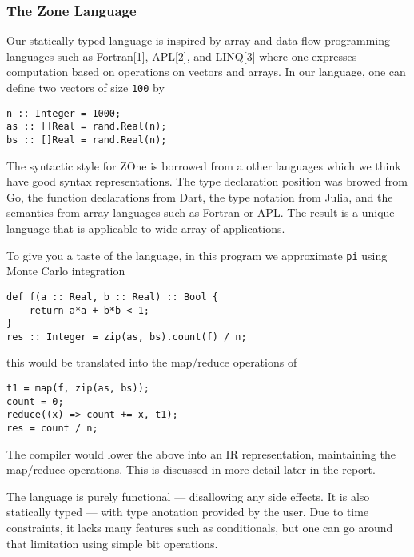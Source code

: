 \subsubsection{The Zone Language}
\label{sec:zonelang}

Our statically typed language is inspired by array and data flow
programming languages such as Fortran{[}1{]}, APL{[}2{]}, and
LINQ{[}3{]} where one expresses computation based on operations on
vectors and arrays. In our language, one can define two vectors of size
\texttt{100} by

\begin{verbatim}
n :: Integer = 1000;
as :: []Real = rand.Real(n);
bs :: []Real = rand.Real(n); 
\end{verbatim}


The syntactic style for ZOne is borrowed from a other languages
	which we think have good syntax representations.
The type declaration position was browed from Go\cite{golang},
	the function declarations from Dart\cite{dartlang},
	the type notation from Julia\cite{julialang},
	and the semantics from array languages such as Fortran\cite{Fortran} or APL\cite{APL}.
The result is a unique language that is applicable to wide array
	of applications.



To give you a taste of the language, in this program we approximate
\texttt{pi} using Monte Carlo integration

\begin{verbatim}
def f(a :: Real, b :: Real) :: Bool {
	return a*a + b*b < 1;
}
res :: Integer = zip(as, bs).count(f) / n;
\end{verbatim}

this would be translated into the map/reduce operations of

\begin{verbatim}
t1 = map(f, zip(as, bs));
count = 0;
reduce((x) => count += x, t1);
res = count / n;
\end{verbatim}

The compiler would lower the above into an IR representation,
maintaining the map/reduce operations. This is discussed 
in more detail later in the report.


The language is purely functional --- disallowing any side effects.
It is also statically typed --- with type anotation provided by the user.
Due to time constraints, it lacks many features such as conditionals, but 
	one can go around that limitation using simple bit operations.


